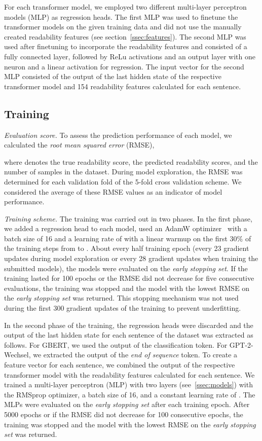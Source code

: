 \documentclass[11pt,a4paper]{article}
\begin{document}
For each transformer model, we employed two different multi-layer perceptron models (MLP) as regression heads.
The first MLP was used to finetune the transformer models on the given training data and did not use the manually created readability features (see section~\ref{ssec:features}).
The second MLP was used after finetuning to incorporate the readability features and consisted of a fully connected layer, followed by ReLu activations and an output layer with one neuron and a linear activation for regression.
The input vector for the second MLP consisted of the output of the last hidden state of the respective transformer model and 154 readability features calculated for each sentence. 
\subsection{Training}
\label{sec:training}

\emph{Evaluation score.}
To assess the prediction performance of each model, we calculated the \emph{root mean squared error} (RMSE),



where  denotes the true readability score,  the predicted readability scores, and  the number of samples in the dataset.
During model exploration, the RMSE was determined for each validation fold of the 5-fold cross validation scheme. We considered the average of these RMSE values as an indicator of model performance.

\emph{Training scheme.} The training was carried out in two phases. In the first phase,
we added a regression head to each model, used an AdamW optimizer~\cite{Loshchilov2019} with a batch size of 16 and a learning rate of \mbox{} with a linear warmup on the first 30\% of the training steps from  to .
About every half training epoch (every 23 gradient updates during model exploration or every 28 gradient updates when training the submitted models), the models were evaluated on the \emph{early stopping set}.
If the training lasted for 100 epochs or the RMSE did not decrease for five consecutive evaluations, the training was stopped and the model with the lowest RMSE on the \emph{early stopping set} was returned.
This stopping mechanism was not used during the first 300 gradient updates of the training to prevent underfitting.

In the second phase of the training, the regression heads were discarded and the output of the last hidden state for each sentence of the dataset was extracted as follows.
For GBERT, we used the output of the classification token.
For \mbox{GPT-2-Wechsel}, we extracted the output of the \emph{end of sequence} token.
To create a feature vector for each sentence, we combined the output of the respective transformer model with the readability features calculated for each sentence.
We trained a multi-layer perceptron (MLP) with two layers (see~\ref{ssec:models}) with the RMSprop optimizer, a batch size of 16, and a constant learning rate of .
The MLPs were evaluated on the \emph{early stopping set} after each training epoch.
After 5000 epochs or if the RMSE did not decrease for 100 consecutive epochs, the training was stopped and the model with the lowest RMSE on the \emph{early stopping set} was returned.
\end{document}

